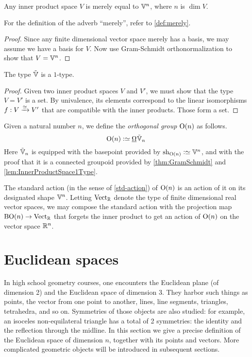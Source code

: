 \begin{theorem}\label{thm:GramSchmidt}
  Any inner product space $V$ is merely equal to $\mathbb V^n$, where $n$ is $\dim V$.
\end{theorem}

For the definition of the adverb ``merely'', refer to \cref{def:merely}.

\begin{proof}
  Since any finite dimensional vector space merely has a basis, we may assume
  we have a basis for $V$.  Now use Gram-Schmidt orthonormalization to show
  that $V = \mathbb V^n$.
\end{proof}

\begin{lemma}\label{lem:InnerProductSpace1Type}
  The type ${\tilde {\mathbb V}}$ is a $1$-type.
\end{lemma}

\begin{proof}
  Given two inner product spaces $V$ and $V'$, we must show that the type
  $V=V'$ is a set.  By univalence, its elements correspond to the linear
  isomorphisms $f : V \xrightarrow {\simeq} V'$ that are compatible with the
  inner products.  Those form a set.
\end{proof}

\begin{definition}\label{def:OrthogonalGroup}
  Given a natural number $n$, we define the {\em orthogonal group} $\mathrm{O}(n)$
  as follows.
  $$\OrthGp n \defeq \mkgroup \OS_n$$
  Here ${\tilde {\mathbb V}}_n$ is equipped with the basepoint provided by $\sh_{\OrthGp n} \defeq \VV^n$, and with the
  proof that it is a connected groupoid provided by \cref{thm:GramSchmidt} and
  \cref{lem:InnerProductSpace1Type}.
\end{definition}

The standard action (in the sense of \cref{std-action}) of $\mathrm{O}(n)$ is an
action of it on its designated shape $\mathbb V^n$.  Letting $\mathrm{Vect}_{\mathbb{R}}$ denote
the type of finite dimensional real vector spaces, we may compose the standard
action with the projection map $\mathrm{B} \mathrm{O}(n) \to \mathrm{Vect}_{\mathbb{R}}$ that
forgets the inner product to get an action of $\mathrm{O}(n)$ on the vector space
$\mathbb{R}^n$.

\section{Euclidean spaces}

In high school geometry courses, one encounters the Euclidean plane (of
dimension 2) and the Euclidean space of dimension 3.  They harbor such things
as points, the vector from one point to another, lines, line segments,
triangles, tetrahedra, and so on.  Symmetries of those objects are also
studied: for example, an isoceles non-equilateral triangle has a total of 2
symmetries: the identity and the reflection through the midline.  In this
section we give a precise definition of the Euclidean space of dimension $n$,
together with its points and vectors.  More complicated geometric objects will
be introduced in subsequent sections.

